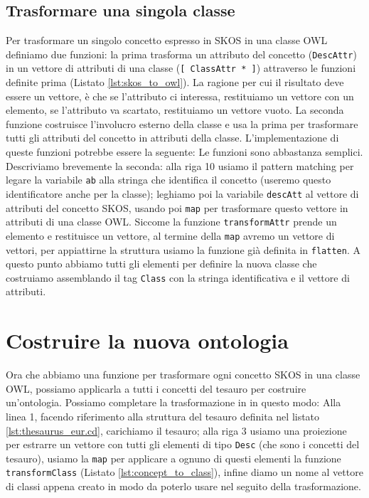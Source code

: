 \subsection{Trasformare una singola classe}
Per trasformare un singolo concetto espresso in SKOS in una classe OWL definiamo due funzioni: la prima trasforma un attributo del concetto (\verb|DescAttr|) in un vettore di attributi di una classe (\verb|[ ClassAttr * ]|) attraverso le funzioni definite prima (Listato \ref{lst:skos_to_owl}). La ragione per cui il risultato deve essere un vettore, è che se l'attributo ci interessa, restituiamo un vettore con un elemento, se l'attributo va scartato, restituiamo un vettore vuoto. La seconda funzione costruisce l'involucro esterno della classe e usa la prima per trasformare tutti gli attributi del concetto in attributi della classe. L'implementazione di queste funzioni potrebbe essere la seguente:
Le funzioni sono abbastanza semplici. Descriviamo brevemente la seconda: alla riga 10 usiamo il pattern matching per legare la variabile \verb|ab| alla stringa che identifica il concetto (useremo questo identificatore anche per la classe); leghiamo poi la variabile \verb|descAtt| al vettore di attributi del concetto SKOS, usando poi \verb|map| per trasformare questo vettore in attributi di una classe OWL. Siccome la funzione \verb|transformAttr| prende un elemento e restituisce un vettore, al termine della \verb|map| avremo un vettore di vettori, per appiattirne la struttura usiamo la funzione già definita in \cduce \verb|flatten|. A questo punto abbiamo tutti gli elementi per definire la nuova classe che costruiamo assemblando il tag \verb|Class| con la stringa identificativa e il vettore di attributi.
\section{Costruire la nuova ontologia}
Ora che abbiamo una funzione per trasformare ogni concetto SKOS in una classe OWL, possiamo applicarla a tutti i concetti del tesauro per costruire un'ontologia. Possiamo completare la trasformazione in \cduce in questo modo:
Alla linea 1, facendo riferimento alla struttura del tesauro definita nel listato \ref{lst:thesaurus_eur.cd}, carichiamo il tesauro; alla riga 3 usiamo una proiezione per estrarre un vettore con tutti gli elementi di tipo \verb|Desc| (che sono i concetti del tesauro), usiamo la \verb|map| per applicare a ognuno di questi elementi la funzione \verb|transformClass| (Listato \ref{lst:concept_to_class}), infine diamo un nome al vettore di classi appena creato in modo da poterlo usare nel seguito della trasformazione.

